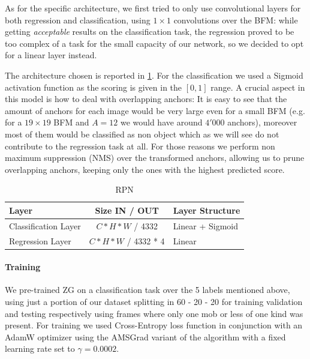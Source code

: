 \documentclass[10pt,journal,cspaper,compsoc]{IEEEtran}
\begin{document}
     As for the specific architecture, we first tried to only use convolutional layers for both regression and classification, using $1\times 1$ convolutions over the BFM: while getting \emph{acceptable} results on the classification task, the regression proved to be too complex of a task for the small capacity of our network, so we decided to opt for a linear layer instead. 

The architecture chosen is reported in \ref{tab:Table 2}. For the classification we used a Sigmoid activation function as the scoring is given in the $[0, 1]$ range.  A crucial aspect in this model is how to deal with overlapping anchors: It is easy to see that the amount of anchors for each image would be very large even for a small BFM (e.g. for a $19\times 19$ BFM and $A = 12$ we would have around $4'000$ anchors), moreover most of them would be classified as non object which as we will see do not contribute to the regression task at all. For those reasons we perform non maximum suppression (NMS) over the transformed anchors, allowing us to prune overlapping anchors, keeping only the ones with the highest predicted score.

    \begin{table}[htb]
        \caption{RPN}
        \label{tab:Table 2}
        \begin{tabularx}{.5\textwidth}{l | c |  l}  
            \textbf{Layer} & \textbf{Size IN / OUT} & \textbf{Layer Structure}\\
            \hline 
            Classification Layer &  $ C * H * W$ / 4332        & Linear + Sigmoid \\ 
            Regression Layer    &  $ C * H * W$ / 4332 * 4  & Linear \\
        \end{tabularx}
    \end{table}
    
    \paragraph*{Training}%
	    We pre-trained ZG on a classification task over the 5 labels mentioned above,  using just a portion of our dataset splitting in 60 - 20 - 20 for training validation and testing respectively using frames where only one mob or less of one kind was present. For training we used Cross-Entropy loss function in conjunction with an AdamW optimizer using the AMSGrad variant of the algorithm with a fixed learning rate set to $\gamma = 0.0002$.
\end{document}
